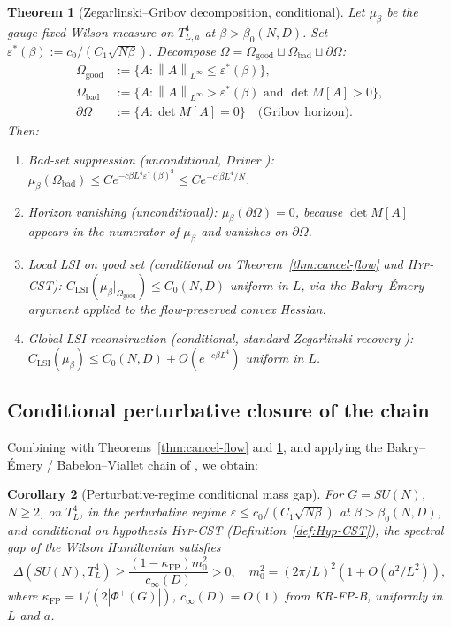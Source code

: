 \documentclass[11pt,a4paper]{amsart}
\newtheorem{theorem}{Theorem}[section]
\newtheorem{corollary}[theorem]{Corollary}
\theoremstyle{definition}
\newcommand{\norm}[1]{\left\lVert#1\right\rVert}
\newcommand{\kFP}{\kappa_{\mathrm{FP}}}
\begin{document}
\begin{theorem}[Zegarlinski--Gribov decomposition, conditional]\label{thm:zeg-gribov}
Let $\mu_\beta$ be the gauge-fixed Wilson measure on $T^4_{L,a}$ at $\beta > \beta_0(N,D)$.
Set $\varepsilon^*(\beta) := c_0 /(C_1\sqrt{N\beta})$. Decompose
$\Omega = \Omega_{\mathrm{good}} \sqcup \Omega_{\mathrm{bad}} \sqcup \partial\Omega$:
\begin{align*}
\Omega_{\mathrm{good}} &:= \{A : \norm{A}_{L^\infty} \leq \varepsilon^*(\beta)\}, \\
\Omega_{\mathrm{bad}} &:= \{A : \norm{A}_{L^\infty} > \varepsilon^*(\beta) \text{ and } \det M[A] > 0\}, \\
\partial\Omega &:= \{A : \det M[A] = 0\} \quad \text{(Gribov horizon).}
\end{align*}
Then:
\begin{enumerate}[label=(\alph*),leftmargin=2em]
\item \emph{Bad-set suppression} (unconditional, Driver \cite{Driver1989}):
$\mu_\beta(\Omega_{\mathrm{bad}}) \leq C e^{-c \beta L^4 \varepsilon^*(\beta)^2}
\leq C e^{-c' \beta L^4 / N}$.
\item \emph{Horizon vanishing} (unconditional):
$\mu_\beta(\partial \Omega) = 0$, because $\det M[A]$ appears in the
\emph{numerator} of $\mu_\beta$ and vanishes on $\partial\Omega$.
\item \emph{Local LSI on good set} (conditional on
Theorem~\ref{thm:cancel-flow} and \textsc{Hyp-CST}):
$C_{\mathrm{LSI}}(\mu_\beta|_{\Omega_{\mathrm{good}}}) \leq C_0(N, D)$
uniform in $L$, via the Bakry--\'Emery argument applied to the
flow-preserved convex Hessian.
\item \emph{Global LSI reconstruction} (conditional, standard Zegarlinski
recovery \cite{Zegarlinski1996, BakryGentilLedoux2014}):
$C_{\mathrm{LSI}}(\mu_\beta) \leq C_0(N, D) + O(e^{-c\beta L^4})$
uniform in $L$.
\end{enumerate}
\end{theorem}

\subsection{Conditional perturbative closure of the chain}

Combining \cite{RemondiereFPHess_2026} with Theorems~\ref{thm:cancel-flow} and
\ref{thm:zeg-gribov}, and applying the Bakry--\'Emery / Babelon--Viallet
chain of \cite{RemondiereKRFPBakryEmery_2026}, we obtain:

\begin{corollary}[Perturbative-regime conditional mass gap]\label{cor:gap}
For $G = SU(N)$, $N \geq 2$, on $T^4_L$, in the perturbative regime
$\varepsilon \leq c_0/(C_1 \sqrt{N\beta})$ at $\beta > \beta_0(N, D)$,
and \emph{conditional on hypothesis \textsc{Hyp-CST}} (Definition~\ref{def:Hyp-CST}),
the spectral gap of the Wilson Hamiltonian satisfies
\[
\Delta(SU(N), T^4_L) \geq \frac{(1-\kFP) m_0^2}{c_\infty(D)} > 0,
\quad m_0^2 = (2\pi/L)^2(1 + O(a^2/L^2)),
\]
where $\kFP = 1/(2|\Phi^+(G)|)$, $c_\infty(D) = O(1)$ from KR-FP-B,
uniformly in $L$ and $a$.
\end{corollary}
\end{document}
